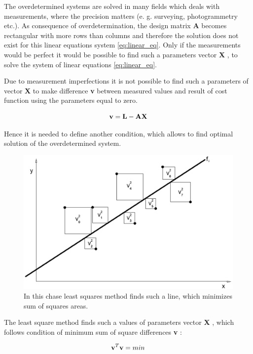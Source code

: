 \documentclass[a4paper,12pt]{article}
\newcommand{\ematr}[1]{
{\bf #1}
}
\newcommand{\evect}[1]{
{\bf #1}
}
\begin{document}
The overdetermined systems are solved in many fields which deals with measurements, where the precision matters (e. g. 
surveying, photogrammetry etc.).
As consequence of overdetermination, the design matrix \ematr{A} becomes rectangular with more rows than columns 
and therefore the solution does not exist for this linear equations system \eqref{eq:linear_eq}.
Only if the measurements would be perfect it would be possible to find such a parameters vector \evect{X}, to 
solve the system of linear equations \eqref{eq:linear_eq}. 

Due to measurement imperfections it is not possible to find such a parameters of vector \evect{X} to make difference \evect{v} between measured values and 
result of cost function using the parameters equal to zero.

\begin{equation}
\label{eq:least_v}
\evect{v} = \evect{L} - \ematr{A}\evect{X}
\end{equation} 



Hence it is needed to define another condition, which allows to find optimal solution of the 
overdetermined system.

\begin{figure}[h]
    \centering
    \includegraphics[scale=0.2]{figures/squares.png}
    \caption{In this chase least squares method finds such a line,
    which minimizes sum of squares areas. }
    \label{fig:squares}
\end{figure}

The least square method finds such a values of parameters vector \evect{X}, which 
follows condition of minimum sum of square differences \evect{v}: 

\begin{equation}
\evect{v}^{T} \evect{v} = min
\end{equation} 
\end{document}
